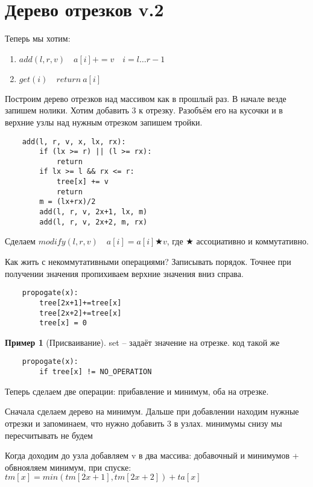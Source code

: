 \documentclass{book}
\theoremstyle{definition}
\newtheorem*{example}{Пример}
\begin{document}
\section{Дерево отрезков v.2}

Теперь мы хотим:
\begin{enumerate}
    \item $add(l, r, v)\quad a[i]+=v\quad i = l \ldots r-1$
    \item $get(i)\quad return~a[i]$
\end{enumerate}

Построим дерево отрезков над массивом как в прошлый раз. В начале везде запишем нолики. Хотим добавить 3 к отрезку. Разобъём его на кусочки и в верхние узлы над нужным отрезком запишем тройки.

\begin{verbatim}
    add(l, r, v, x, lx, rx):
        if (lx >= r) || (l >= rx):
            return
        if lx >= l && rx <= r:
            tree[x] += v
            return
        m = (lx+rx)/2
        add(l, r, v, 2x+1, lx, m)
        add(l, r, v, 2x+2, m, rx)
\end{verbatim}

Сделаем $modify(l, r, v)\quad a[i] = a[i]\bigstar  v $, где $\bigstar $ ассоциативно и коммутативно.

Как жить с некоммутативными операциями? Записывать порядок. Точнее при получении значения пропихиваем верхние значения вниз справа.

\begin{verbatim}
    propogate(x):
        tree[2x+1]+=tree[x]
        tree[2x+2]+=tree[x]
        tree[x] = 0
\end{verbatim}

\begin{example}
    [Присваивание]
    set -- задаёт значение на отрезке. код такой же
    \begin{verbatim}
    propogate(x):
        if tree[x] != NO_OPERATION
    \end{verbatim}
\end{example}


Теперь сделаем две операции: прибавление и минимум, оба на отрезке.

Сначала сделаем дерево на минимум. Дальше при добавлении находим нужные отрезки и запоминаем, что нужно добавить 3 в узлах. минимумы снизу мы пересчитывать не будем

Когда доходим до узла добавляем v  в два массива: добавочный и минимумов + обвнояляем минимум, при спуске: $tm[x] = min(tm[2x+1], tm[2x+2]) + ta[x]$
\end{document}
